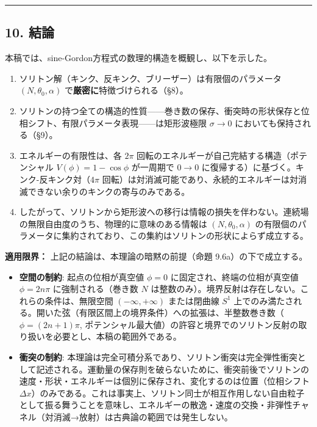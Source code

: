 \documentclass[a4paper,11pt]{ltjsarticle}
\providecommand{\tightlist}{\setlength{\itemsep}{0pt}\setlength{\parskip}{0pt}}
\begin{document}
\begin{center}\rule{0.5\linewidth}{0.5pt}\end{center}

\subsection{10. 結論}\label{ux7d50ux8ad6}

本稿では、sine-Gordon方程式の数理的構造を概観し、以下を示した。

\begin{enumerate}
\def\labelenumi{\arabic{enumi}.}
\item
  ソリトン解（キンク、反キンク、ブリーザー）は有限個のパラメータ
  \((N, \theta_0, \alpha)\) で\textbf{厳密に}特徴づけられる（§8）。
\item
  ソリトンの持つ全ての構造的性質------巻き数の保存、衝突時の形状保存と位相シフト、有限パラメータ表現------は矩形波極限
  \(\sigma \to 0\) においても保持される（§9）。
\item
  エネルギーの有限性は、各 \(2\pi\)
  回転のエネルギーが自己完結する構造（ポテンシャル
  \(V(\phi) = 1-\cos\phi\) が一周期で \(0 \to 0\)
  に復帰する）に基づく。キンク-反キンク対（\(4\pi\)
  回転）は対消滅可能であり、永続的エネルギーは対消滅できない余りのキンクの寄与のみである。
\item
  したがって、ソリトンから矩形波への移行は情報の損失を伴わない。連続場の無限自由度のうち、物理的に意味のある情報は
  \((N, \theta_0, \alpha)\)
  の有限個のパラメータに集約されており、この集約はソリトンの形状によらず成立する。
\end{enumerate}

\textbf{適用限界：} 上記の結論は、本理論の暗黙の前提（命題
9.6a）の下で成立する。

\begin{itemize}
\tightlist
\item
  \textbf{空間の制約}: 起点の位相が真空値 \(\phi = 0\)
  に固定され、終端の位相が真空値 \(\phi = 2n\pi\) に強制される（巻き数
  \(N\) は整数のみ）。境界反射は存在しない。これらの条件は、無限空間
  \((-\infty, +\infty)\) または閉曲線 \(S^1\)
  上でのみ満たされる。開いた弦（有限区間上の境界条件）への拡張は、半整数巻き数（\(\phi = (2n+1)\pi\),
  ポテンシャル最大値）の許容と境界でのソリトン反射の取り扱いを必要とし、本稿の範囲外である。
\item
  \textbf{衝突の制約}:
  本理論は完全可積分系であり、ソリトン衝突は完全弾性衝突として記述される。運動量の保存則を破らないために、衝突前後でソリトンの速度・形状・エネルギーは個別に保存され、変化するのは位置（位相シフト
  \(\Delta x\)）のみである。これは事実上、ソリトン同士が相互作用しない自由粒子として振る舞うことを意味し、エネルギーの散逸・速度の交換・非弾性チャネル（対消滅→放射）は古典論の範囲では発生しない。
\end{itemize}
\end{document}

